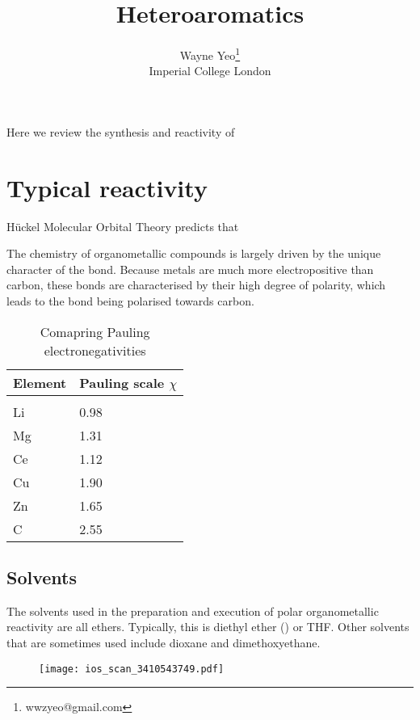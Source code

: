 \documentclass{article} %
\title{Heteroaromatics}
\author{
Wayne Yeo\thanks{wwzyeo@gmail.com} \\
Imperial College London
}
\theoremstyle{definition}
\begin{document}
\maketitle

Here we review the synthesis and reactivity of 

\section{Typical reactivity}

Hückel Molecular Orbital Theory predicts that

The chemistry of organometallic compounds is largely driven by the unique character
of the  bond. Because metals are much more electropositive than carbon, these
bonds are characterised by their high degree of polarity, which leads to the \textsigma\space
bond being polarised towards carbon.

\begin{table}[ht]
   \caption{Comapring Pauling electronegativities}
   \label{electronegativity-table}
   \begin{center}
   \begin{tabular}{ll}
   \multicolumn{1}{c}{\bf Element}  &\multicolumn{1}{c}{\bf{Pauling scale} $\chi$}
   \\ \hline \\
   Li         &0.98 \\
   Mg         &1.31 \\
   Ce         &1.12 \\
   Cu         &1.90 \\
   Zn         &1.65 \\
   C          &2.55 \\

   \end{tabular}
   \end{center}
   \end{table}
   

\subsection*{Solvents}
The solvents used in the preparation and execution of polar organometallic reactivity are all ethers.
Typically, this is diethyl ether () or THF. Other solvents that are sometimes used include
dioxane and dimethoxyethane.

\begin{figure}[ht]
   \begin{center}
      \texttt{[image: ios\_scan\_3410543749.pdf]}
   \end{center}
\end{figure}
\end{document}

